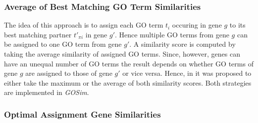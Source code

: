 \documentclass[12pt,a4paper]{article}
\begin{document}
\subsubsection{Average of Best Matching GO Term Similarities }

The idea of this approach \cite{Schlicker2006GOFuncSim} is to assign each GO term $t_i$ occuring in gene $g$ to its best matching partner $t'_{\pi{i}}$ in gene $g'$. Hence multiple GO terms from gene $g$ can be assigned to one GO term from gene $g'$. A similarity score is computed by taking the average similarity of assigned GO terms. Since, however, genes can have an unequal number of GO terms the result depends on whether GO terms of gene $g$ are assigned to those of gene $g'$ or vice versa. Hence, in \cite{Schlicker2006GOFuncSim} it was proposed to either take the maximum or the average of both similarity scores. Both strategies are implemented in \emph{GOSim}. 

\subsubsection{Optimal Assignment Gene Similarities}
\end{document}
